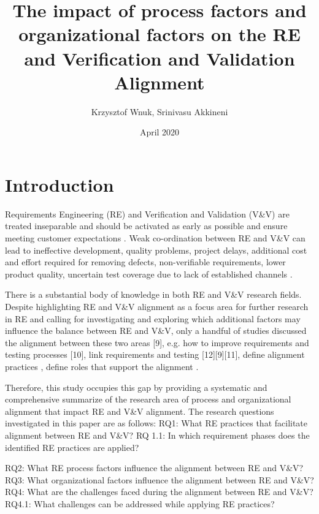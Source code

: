 \documentclass{article}
\title{The impact of process factors and organizational factors on the RE and Verification and Validation Alignment}
\author{Krzysztof Wnuk, Srinivasu Akkineni}
\date{April 2020}
\begin{document}
\maketitle

\section{Introduction}
Requirements Engineering (RE) and Verification and Validation (V\&V) are treated inseparable and should be activated as early as possible and ensure meeting customer expectations \cite{wnuk2014delicate,bjarnason2014challenges}. Weak co-ordination between RE and V\&V can lead to ineffective development, quality problems, project delays,  additional cost and effort required for removing defects, non-verifiable requirements, lower product quality, uncertain test coverage due to lack of established channels \cite{bjarnason2014challenges,graham2002requirements,sabaliauskaite2010challenges,jones2009enabling}. 

There is a substantial body of knowledge in both RE and V\&V research fields. Despite highlighting RE and V\&V alignment as a focus area for further research in RE  \cite{sabaliauskaite2010challenges} \cite{bjarnason2014challenges} \cite{cheng2007research} and calling for investigating and exploring which additional factors may influence the balance between RE and V\&V, only a handful of studies discussed the alignment between these two areas [9], e.g. how to improve requirements and testing processes [10], link requirements and testing [12][9][11], define alignment practices  \cite{bjarnason2014challenges},  define roles that support the alignment  \cite{bjarnason2014challenges} \cite{sabaliauskaite2010challenges}.

Therefore, this study occupies this gap by providing a systematic and comprehensive summarize of the research area of process and organizational alignment that impact RE and V\&V alignment. The research questions investigated in this paper are as follows: 
RQ1: What RE practices that facilitate alignment between RE and V\&V?
RQ 1.1: In which requirement phases does the identified RE practices are applied?

RQ2: What RE process factors influence the alignment between RE and V\&V?
RQ3: What organizational factors influence the alignment between RE and V\&V?
RQ4: What are the challenges faced during the alignment between RE and V\&V?
RQ4.1: What challenges can be addressed while applying RE practices?
\end{document}
